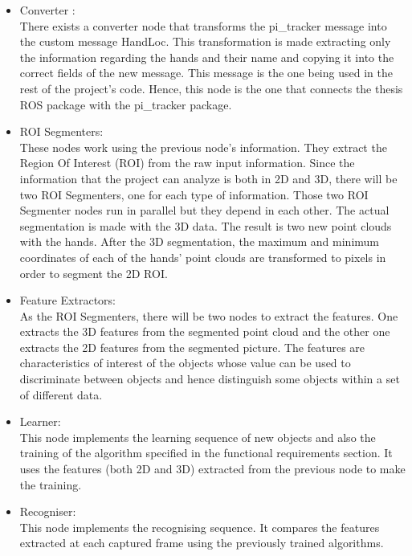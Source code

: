 \documentclass{article}
\begin{document}
\begin{itemize}
\item Converter : \\
There exists a converter node that transforms the pi_tracker message into the custom message HandLoc. This transformation is made extracting only the information regarding the hands and their name and copying it into the correct fields of the new message. 
This message is the one being used in the rest of the project's code. Hence, this node is the one that connects the thesis ROS package with the pi_tracker package.

\item ROI Segmenters:\\ 
These nodes work using the previous node's information. They extract the Region Of Interest (ROI) from the raw input information. Since the information that the project can analyze is both in 2D and 3D, there will be two ROI Segmenters, one for each type of information. 
Those two ROI Segmenter nodes run in parallel but they depend in each other. The actual segmentation is made with the 3D data. The result is two new point clouds with the hands.
After the 3D segmentation, the maximum and minimum coordinates of each of the hands' point clouds are transformed to pixels in order to segment the 2D ROI. 

\item Feature Extractors: \\
As the ROI Segmenters, there will be two nodes to extract the features. One extracts the 3D features from the segmented point cloud and the other one extracts the 2D features from the segmented picture. 
The features are characteristics of interest of the objects whose value can be used to discriminate between objects and hence distinguish some objects within a set of different data. 


\item Learner: \\
This node implements the learning sequence of new objects and also the training of the algorithm specified in the functional requirements section. 
It uses the features (both 2D and 3D) extracted from the previous node to make the training. 

\item Recogniser:\\ 
This node implements the recognising sequence. It compares the features extracted at each captured frame using the previously trained algorithms. 
\end{itemize}
   
\end{document}
